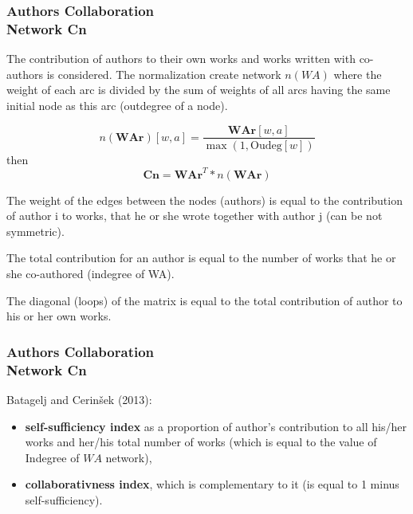\documentclass[hyperref={pdfstartview={FitBH -32768},
                         pdfpagemode=FullScreen,
                         plainpages=false,
                         colorlinks=true}
              ]{beamer}
\begin{document}
\begin{frame}[fragile]
\frametitle{Authors Collaboration\\ \normalsize Network Cn}
\footnotesize

The contribution of authors to their own works and works written with co-authors is considered. The normalization create network $n(WA)$ where the weight of each arc is divided by the sum of weights of all arcs having the same initial node as this arc (outdegree of a node).

\[ n(\mathbf{WAr})[w,a] = \frac {\mathbf{WAr}[w,a]}{\max(1,\textrm{Oudeg}[w])}\]
then 
\[ \mathbf{Cn} = \mathbf{WAr}^T * n(\mathbf{WAr}) \] 
 
The weight of the edges between the nodes (authors) is equal to the contribution of author i to works, that he or she wrote together with author j (can be not symmetric). 

The total contribution for an author is equal to the number of works that he or she co-authored (indegree of WA). 

The diagonal (loops) of the matrix is equal to the total contribution of author to his or her own works.

\end{frame}

\begin{frame}[fragile]
\frametitle{Authors Collaboration\\ \normalsize Network Cn}
\footnotesize

Batagelj and Cerinšek (2013):
\begin{itemize}
\item \textbf{self-sufficiency index} as a proportion of author's contribution to all his/her works and her/his total number of works (which is equal to the value of Indegree of $WA$ network), 
\item \textbf{collaborativness index}, which is complementary to it (is equal to 1 minus self-sufficiency).
\end{itemize}
\end{frame}
\end{document}
